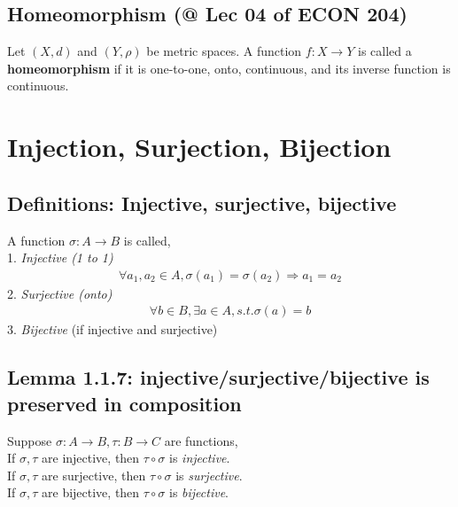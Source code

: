 \documentclass[11pt]{elegantbook}
\begin{document}
\subsection{Homeomorphism \small{(@ Lec 04 of ECON 204)}}
\begin{definition}[Homeomorphism]
    \normalfont
    Let $(X, d)$ and $(Y, \rho)$ be metric spaces. A function $f : X \rightarrow Y$ is called a \textbf{homeomorphism} if it is one-to-one, onto, continuous, and its inverse function is continuous.
\end{definition}

\section{Injection, Surjection, Bijection}
\subsection{Definitions: Injective, surjective, bijective}
A function $\sigma:A \rightarrow B$ is called,\\
1. \textit{Injective (1 to 1)}
\begin{equation}
    \begin{aligned}
        \forall a_1,a_2\in A, \sigma(a_1)=\sigma(a_2)\Rightarrow a_1=a_2
    \end{aligned}
    \nonumber
\end{equation}
2. \textit{Surjective (onto)}
\begin{equation}
    \begin{aligned}
        \forall b\in B,\exists a\in A, s.t. \sigma(a)=b
    \end{aligned}
    \nonumber
\end{equation}
3. \textit{Bijective} (if injective and surjective)

\subsection{Lemma 1.1.7: injective/surjective/bijective is preserved in composition}
\begin{lemma}[Lemma 1.1.7]
    Suppose $\sigma:A \rightarrow B, \tau: B \rightarrow C$ are functions,\\
    If $\sigma, \tau$ are injective, then $\tau\circ\sigma$ is \textit{injective}.\\
    If $\sigma, \tau$ are surjective, then $\tau\circ\sigma$ is \textit{surjective}.\\
    If $\sigma, \tau$ are bijective, then $\tau\circ\sigma$ is \textit{bijective}.
\end{lemma}
\end{document}
